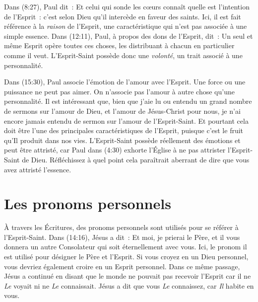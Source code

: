 \begin{specialpar}{}
Dans (8:27), Paul dit~: \og Et celui qui sonde les cœurs
 connaît quelle est l'intention de l'Esprit~: c'est selon Dieu qu'il
 intercède en faveur des saints. \fg{} Ici, il est fait référence
 à la \emph{raison} de l'Esprit, une caractéristique qui n'est pas associée à
 une simple essence. Dans (12:11), Paul, à propos des dons de
 l'Esprit, dit~: \og Un seul et même Esprit opère toutes ces choses, les
 distribuant à chacun en particulier comme il veut. \fg{} L'Esprit-Saint
 possède donc une \emph{volonté}, un trait associé à une personnalité.
\end{specialpar}

\begin{specialpar}{}
Dans (15:30), Paul associe l'émotion de l'amour avec l'Es\-prit.
 Une force ou une puissance ne peut pas aimer. On n'associe pas l'amour à autre
 chose qu'une personnalité. Il est intéressant que, bien que j'aie lu ou
 entendu un grand nombre de sermons sur l'amour de Dieu, et l'amour de
 Jésus-Christ pour nous, je n'ai encore jamais entendu de sermon sur l'amour de
 l'Esprit-Saint. Et pourtant cela doit être l'une des principales
 caractéristiques de l'Esprit, puisque c'est le fruit qu'Il produit dans nos
 vies. L'Esprit-Saint possède réellement des émotions et peut être attristé,
 car Paul dans (4:30) exhorte l'Église à ne pas attrister
 l'Esprit-Saint de Dieu. Réfléchissez à quel point cela paraîtrait aberrant
 de dire que vous avez attristé l'essence.
\end{specialpar}


\section{Les pronoms personnels}

À travers les Écritures, des pronoms personnels sont utilisés pour se
 référer à l'Esprit-Saint. Dans (14:16), Jésus a dit~:
 \og Et moi, je prierai le Père, et il vous donnera un autre Consolateur
 qui soit éternellement avec vous. \fg{}
 Ici, le pronom \og il \fg{} est utilisé pour désigner le Père et l'Esprit.
 Si vous croyez en un Dieu personnel, vous devriez également croire en
 un Esprit personnel. Dans ce même passage, Jésus a continué en disant
 que le monde ne pouvait pas recevoir l'Esprit car il ne \emph{Le} voyait ni
 ne \emph{Le} connaissait. Jésus a dit que vous \emph{Le} connaissez,
 car \emph{Il} habite en vous.

